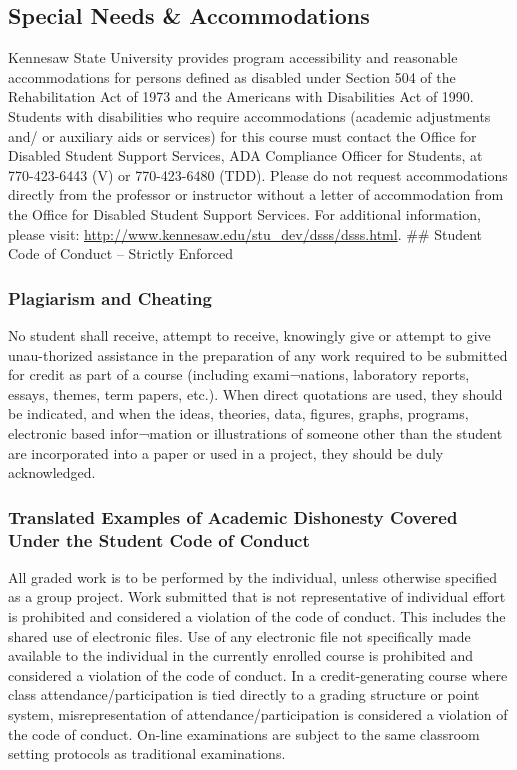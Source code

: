 \documentclass[11pt,]{article}
\begin{document}
\hypertarget{special-needs-accommodations}{%
\subsection{Special Needs \& Accommodations}\label{special-needs-accommodations}}

Kennesaw State University provides program accessibility and reasonable accommodations for persons
defined as disabled under Section 504 of the Rehabilitation Act of 1973 and the Americans with
Disabilities Act of 1990. Students with disabilities who require accommodations (academic adjustments and/
or auxiliary aids or services) for this course must contact the Office for Disabled Student Support Services,
ADA Compliance Officer for Students, at 770-423-6443 (V) or 770-423-6480 (TDD). Please do not request
accommodations directly from the professor or instructor without a letter of accommodation from the
Office for Disabled Student Support Services. For additional information, please visit: \url{http://www.kennesaw.edu/stu_dev/dsss/dsss.html}.
\#\# Student Code of Conduct -- Strictly Enforced

\hypertarget{plagiarism-and-cheating}{%
\subsubsection{Plagiarism and Cheating}\label{plagiarism-and-cheating}}

No student shall receive, attempt to receive, knowingly give or attempt to give unau-thorized assistance in
the preparation of any work required to be submitted for credit as part of a course (including exami¬nations,
laboratory reports, essays, themes, term papers, etc.). When direct quotations are used, they should be
indicated, and when the ideas, theories, data, figures, graphs, programs, electronic based infor¬mation or
illustrations of someone other than the student are incorporated into a paper or used in a project, they should
be duly acknowledged.

\hypertarget{translated-examples-of-academic-dishonesty-covered-under-the-student-code-of-conduct}{%
\subsubsection{Translated Examples of Academic Dishonesty Covered Under the Student Code of Conduct}\label{translated-examples-of-academic-dishonesty-covered-under-the-student-code-of-conduct}}

All graded work is to be performed by the individual, unless otherwise specified as a group project. Work
submitted that is not representative of individual effort is prohibited and considered a violation of the code of
conduct. This includes the shared use of electronic files. Use of any electronic file not specifically made
available to the individual in the currently enrolled course is prohibited and considered a violation of the
code of conduct. In a credit-generating course where class attendance/participation is tied directly to a
grading structure or point system, misrepresentation of attendance/participation is considered a
violation of the code of conduct. On-line examinations are subject to the same classroom setting
protocols as traditional examinations.
\end{document}
